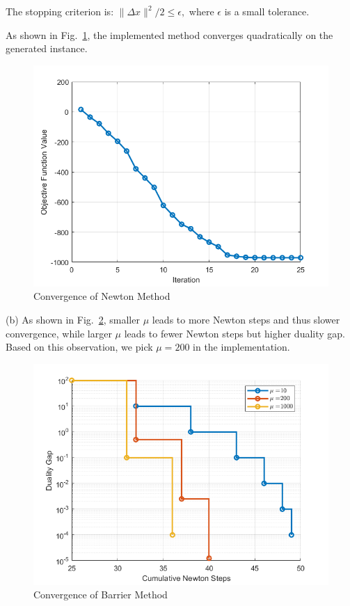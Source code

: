 \documentclass[11pt]{article}
\begin{document}
The stopping criterion is:
\(
{\|\Delta x\|^2}/2 \leq \epsilon,
\)
where \(\epsilon\) is a small tolerance.

As shown in Fig.~\ref{fig:centering}, the implemented method converges quadratically on the generated instance.


\begin{figure}[htb]
  \includegraphics[width=0.7\columnwidth]{"final_p5_a"}
  \centering
  \caption{Convergence of Newton Method}
  \label{fig:centering}
\end{figure}


(b)
As shown in Fig.~\ref{fig:barrier}, smaller \(\mu\) leads to more Newton steps and thus slower convergence, while larger \(\mu\) leads to fewer Newton steps but higher duality gap. Based on this observation, we pick \(\mu = 200\) in the implementation.

\begin{figure}[htb]
  \includegraphics[width=0.7\columnwidth]{"final_p5_b"}
  \centering
  \caption{Convergence of Barrier Method}
  \label{fig:barrier}
\end{figure}
\end{document}
